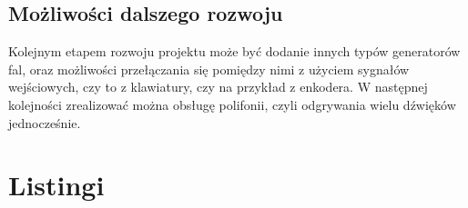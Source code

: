 \documentclass[a4paper,12pt]{article}
\begin{document}
\subsection{Możliwości dalszego rozwoju}
Kolejnym etapem rozwoju projektu może być dodanie innych typów generatorów fal, oraz możliwości przełączania się pomiędzy nimi z użyciem sygnałów wejściowych, czy to z klawiatury, czy na przykład z enkodera. W następnej kolejności zrealizować można obsługę polifonii, czyli odgrywania wielu dźwięków jednocześnie.

\clearpage
\section{Listingi}









\clearpage

\nocite{*}
\newpage

\printbibliography
\end{document}
